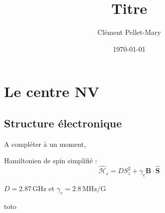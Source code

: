 \documentclass[a4paper]{report}
\title{Titre}
\author{Clément Pellet-Mary}
\date\today
\begin{document}
\chapter{Le centre NV}
  \section{Structure électronique}
  A compléter à un moment,
  
  Hamiltonien de spin simplifié : 
  \begin{equation}
  \hat{\mathcal{H}}_s=D S_z^2 + \gamma_e \textbf{B}\cdot\hat{\textbf{S}}
  \end{equation}
  \begin{center}
  $D=2.87 \,$GHz et $\gamma_e=2.8\,\mathrm{MHz}/\mathrm{G}$
\end{center}   
  
  toto
 
  
\end{document}
